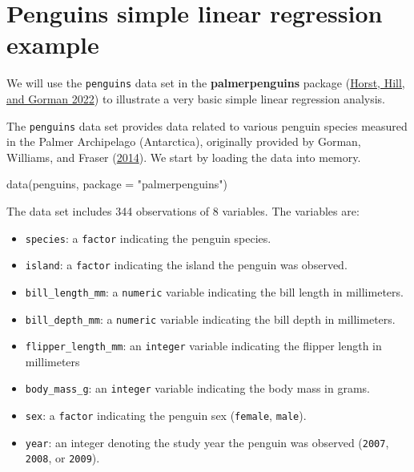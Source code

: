 \documentclass[
]{book}
\newenvironment{Shaded}{\begin{snugshade}}{\end{snugshade}}
\newcommand{\AttributeTok}[1]{\textcolor[rgb]{0.77,0.63,0.00}{#1}}
\newcommand{\FunctionTok}[1]{\textcolor[rgb]{0.00,0.00,0.00}{#1}}
\newcommand{\NormalTok}[1]{#1}
\newcommand{\StringTok}[1]{\textcolor[rgb]{0.31,0.60,0.02}{#1}}
\providecommand{\tightlist}{%
  \setlength{\itemsep}{0pt}\setlength{\parskip}{0pt}}
\theoremstyle{definition}
\theoremstyle{definition}
\theoremstyle{definition}
\theoremstyle{definition}
\theoremstyle{remark}
\begin{document}
\hypertarget{s:penguins-slr}{%
\section{Penguins simple linear regression example}\label{s:penguins-slr}}

We will use the \texttt{penguins} data set in the \textbf{palmerpenguins} package (\protect\hyperlink{ref-R-palmerpenguins}{Horst, Hill, and Gorman 2022}) to illustrate a very basic simple linear regression analysis.

The \texttt{penguins} data set provides data related to various penguin species measured in the Palmer Archipelago (Antarctica), originally provided by Gorman, Williams, and Fraser (\protect\hyperlink{ref-GormanEtAl2014}{2014}). We start by loading the data into memory.

\begin{Shaded}
\begin{Highlighting}[]
\FunctionTok{data}\NormalTok{(penguins, }\AttributeTok{package =} \StringTok{"palmerpenguins"}\NormalTok{)}
\end{Highlighting}
\end{Shaded}

The data set includes 344 observations of
8 variables. The variables are:

\begin{itemize}
\tightlist
\item
  \texttt{species}: a \texttt{factor} indicating the penguin species.
\item
  \texttt{island}: a \texttt{factor} indicating the island the penguin was observed.
\item
  \texttt{bill\_length\_mm}: a \texttt{numeric} variable indicating the bill length in millimeters.
\item
  \texttt{bill\_depth\_mm}: a \texttt{numeric} variable indicating the bill depth in millimeters.
\item
  \texttt{flipper\_length\_mm}: an \texttt{integer} variable indicating the flipper
  length in millimeters
\item
  \texttt{body\_mass\_g}: an \texttt{integer} variable indicating the body mass in grams.
\item
  \texttt{sex}: a \texttt{factor} indicating the penguin sex (\texttt{female}, \texttt{male}).
\item
  \texttt{year}: an integer denoting the study year the penguin was observed (\texttt{2007}, \texttt{2008}, or \texttt{2009}).
\end{itemize}
\end{document}
